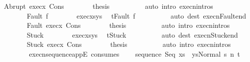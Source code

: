 \begin{isabellebody}
\ Abrupt\ exec{\isacharunderscore}x\ Cons\isanewline
\ \ \ \ \ \ \isamarkupfalse%
\ {\isacharquery}thesis\isanewline
\ \ \ \ \ \ \ \ \isamarkupfalse%
\ {\isacharparenleft}auto\ intro{\isacharcolon}\ execn{\isachardot}intros{\isacharparenright}\isanewline
\ \ \ \ \isamarkupfalse%
\isanewline
\ \ \ \ \ \ \isamarkupfalse%
\ {\isacharparenleft}Fault\ f{\isacharparenright}\isanewline
\ \ \ \ \ \ \isamarkupfalse%
\ exec{\isacharunderscore}xs{\isacharunderscore}ys\ \isamarkupfalse%
\ {\isachardoublequoteopen}t{\isacharequal}Fault\ f{\isachardoublequoteclose}\isanewline
\ \ \ \ \ \ \ \ \isamarkupfalse%
\ {\isacharparenleft}auto\ dest{\isacharcolon}\ execn{\isacharunderscore}Fault{\isacharunderscore}end{\isacharparenright}\isanewline
\ \ \ \ \ \ \isamarkupfalse%
\ Fault\ exec{\isacharunderscore}x\ Cons\isanewline
\ \ \ \ \ \ \isamarkupfalse%
\ {\isacharquery}thesis\isanewline
\ \ \ \ \ \ \ \ \isamarkupfalse%
\ {\isacharparenleft}auto\ intro{\isacharcolon}\ execn{\isachardot}intros{\isacharparenright}\isanewline
\ \ \ \ \isamarkupfalse%
\isanewline
\ \ \ \ \ \ \isamarkupfalse%
\ Stuck\isanewline
\ \ \ \ \ \ \isamarkupfalse%
\ exec{\isacharunderscore}xs{\isacharunderscore}ys\ \isamarkupfalse%
\ {\isachardoublequoteopen}t{\isacharequal}Stuck{\isachardoublequoteclose}\isanewline
\ \ \ \ \ \ \ \ \isamarkupfalse%
\ {\isacharparenleft}auto\ dest{\isacharcolon}\ execn{\isacharunderscore}Stuck{\isacharunderscore}end{\isacharparenright}\isanewline
\ \ \ \ \ \ \isamarkupfalse%
\ Stuck\ exec{\isacharunderscore}x\ Cons\isanewline
\ \ \ \ \ \ \isamarkupfalse%
\ {\isacharquery}thesis\isanewline
\ \ \ \ \ \ \ \ \isamarkupfalse%
\ {\isacharparenleft}auto\ intro{\isacharcolon}\ execn{\isachardot}intros{\isacharparenright}\isanewline
\ \ \ \ \isamarkupfalse%
\isanewline
\ \ \isamarkupfalse%
\isanewline
{}\isamarkupfalse%
%
\endisatagproof
{\isafoldproof}%
%
\isadelimproof
\isanewline
%
\endisadelimproof
\ \ \ \ \isanewline
{}\isamarkupfalse%
\ execn{\isacharunderscore}sequence{\isacharunderscore}appE\ {\isacharbrackleft}consumes\ {}{\isacharbrackright}{\isacharcolon}\ \isanewline
\ \ {\isachardoublequoteopen}{\isasymlbrakk}{\isasymGamma}{\isasymturnstile}{\isasymlangle}sequence\ Seq\ {\isacharparenleft}xs\ {\isacharat}\ ys{\isacharparenright}{\isacharcomma}Normal\ s{\isasymrangle}\ {\isacharequal}n{\isasymRightarrow}\ t{\isacharsemicolon}\isanewline

\end{isabellebody}
